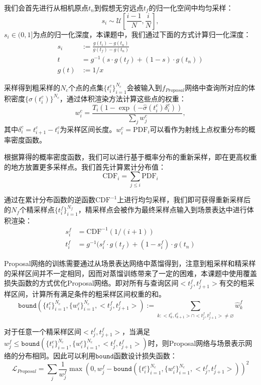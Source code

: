 我们会首先进行从相机原点$t_n$到假想无穷远点$t_f$的归一化空间中均匀采样：
\begin{equation}
    s_i\sim\mathcal{U}\left[\frac{i-1}{N}, \frac{i}{N}\right],
\end{equation}
$s_i\in(0,1]$为点的归一化深度，本课题中，我们通过下面的方式计算归一化深度：
\begin{align}
    s_i&:=\frac{g(t_i)-g(t_n)}{g(t_f)-g(t_n)}\\
    t&=g^{-1}(s\cdot g(t_f) + (1-s)\cdot g(t_n))\\
    g(t)&:= 1/x
\end{align}

采样得到粗采样的$N_c$个点的点集$\{t_i^c\}_{i=1}^{N_c}$会被输入到$f_{Proposal}$网络中查询所对应的体积密度$\{\hat{\sigma}(t_i^c)\}^{N_c}$，通过体积渲染方法计算这些点的权重：
\begin{equation}
    w_i^c = \frac{T_i(1-\exp(-\hat{\sigma}(t_i^c)\delta_i^c))}{\sum_j w_j^c},
\end{equation}
其中$\delta_i^c = t_{i+1}^c - t_i^c$为采样区间长度。$w_i^c = \text{PDF}_i$可以看作为射线上点权重分布的概率密度函数。

根据算得的概率密度函数，我们可以进行基于概率分布的重新采样，即在更高权重的地方放置更多采样点。我们首先计算累计分布值：
\begin{equation}
    \text{CDF}_i = \sum_{j \leq i} \text{PDF}_i
\end{equation}

通过在累计分布函数的逆函数$\text{CDF}^{-1}$上进行均匀采样，我们即可获得重新采样后的$N_f$个精采样点$\{t_i^f\}_{i=1}^{N_f}$，精采样点会被作为最终采样点输入到场景表达中进行体积渲染：
\begin{align}
    s^f_i &= \text{CDF}^{-1}(1/(i + 1))\\
    t^f_i &= g^{-1}(s^f_i\cdot g(t_f) + (1-s^f_i)\cdot g(t_n)
\end{align}

Proposal网络的训练需要通过从场景表达网络中蒸馏得到，注意到粗采样和精采样的采样区间并不一定相同，因而对蒸馏训练带来了一定的困难，本课题中使用覆盖损失函数的方式优化Proposal网络\cite{barron_mip-nerf_2022}。即对所有与查询区间$<t_{j}^f, t_{j+1}^f>$有交的粗采样区间，计算所有满足条件的粗采样区间权重的和。
\begin{equation}
    \mathtt{bound}(\{t_i^c\}_{i=1}^{N_c}, \{w_i^c\}_{i=1}^{N_c}, <t_{j}^f, t_{j+1}^f>) :=\sum_{k:<t_{k}^c,t_{k+1}^c>\cap<t_{j}^f, t_{j+1}^f>\neq\varnothing}\hat{w}_k^f
\end{equation}

对于任意一个精采样区间$<t_{j}^f, t_{j+1}^f>$，当满足$w_j^f\leq \mathtt{bound}(\{t_i^c\}_{i=1}^{N_c}, \{w_i^c\}_{i=1}^{N_c}, <t_{j}^f, t_{j+1}^f>)$时，则Proposal网络与场景表示网络的分布相同。因此可以利用$\mathtt{bound}$函数设计损失函数：
\begin{equation}
    \mathcal{L}_{Proposal}=\sum_j\frac{1}{w_j^f}\max(0, w_j^f- \mathtt{bound}(\{t_i^c\}_{i=1}^{N_c}, \{w_i^c\}_{i=1}^{N_c}, <t_{j}^f, t_{j+1}^f>))^2
\end{equation}

